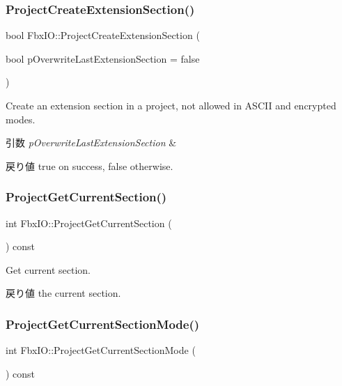 \subsubsection{\texorpdfstring{Project\+Create\+Extension\+Section()}{ProjectCreateExtensionSection()}}
{\footnotesize\ttfamily bool Fbx\+I\+O\+::\+Project\+Create\+Extension\+Section (\begin{DoxyParamCaption}\item[{bool}]{p\+Overwrite\+Last\+Extension\+Section = {\ttfamily false} }\end{DoxyParamCaption})}

Create an extension section in a project, not allowed in A\+S\+C\+II and encrypted modes. 
\begin{DoxyParams}{引数}
{\em p\+Overwrite\+Last\+Extension\+Section} & \\
\hline
\end{DoxyParams}
\begin{DoxyReturn}{戻り値}
{\ttfamily true} on success, {\ttfamily false} otherwise. 
\end{DoxyReturn}
\mbox{\label{class_fbx_i_o_ab98db88288777a2c4e6534d3fd58ecd2}} 
\subsubsection{\texorpdfstring{Project\+Get\+Current\+Section()}{ProjectGetCurrentSection()}}
{\footnotesize\ttfamily int Fbx\+I\+O\+::\+Project\+Get\+Current\+Section (\begin{DoxyParamCaption}{ }\end{DoxyParamCaption}) const}

Get current section. \begin{DoxyReturn}{戻り値}
the current section. 
\end{DoxyReturn}
\mbox{\label{class_fbx_i_o_a7f79a8e25c3312c66827303b4f3d4836}} 
\subsubsection{\texorpdfstring{Project\+Get\+Current\+Section\+Mode()}{ProjectGetCurrentSectionMode()}}
{\footnotesize\ttfamily int Fbx\+I\+O\+::\+Project\+Get\+Current\+Section\+Mode (\begin{DoxyParamCaption}{ }\end{DoxyParamCaption}) const}

